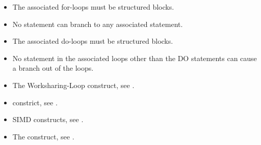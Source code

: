 \begin{ccppspecific}
\begin{itemize}

  \item The associated for-loops must be structured blocks.

  \item No statement can branch to any associated  statement.

\end{itemize}

\end{ccppspecific}

\begin{fortranspecific}
\begin{itemize}

  \item The associated do-loops must be structured blocks.

  \item No statement in the associated loops other than the DO statements can cause
    a branch out of the loops.


\end{itemize}
\end{fortranspecific}

\crossreferences
\begin{itemize}
  \item The Worksharing-Loop construct, see .

  \item {} constrict, see .

  \item SIMD constructs, see .

  \item The  construct, see .

\end{itemize}
